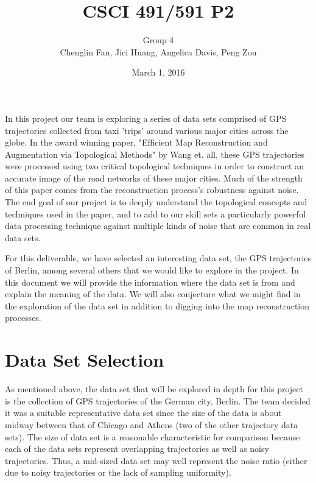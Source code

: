 \documentclass[11pt]{article}
\title{CSCI 491/591 P2}
\date{March 1, 2016}
\author{Group 4\\Chenglin Fan, Jici Huang,
Angelica Davis, Peng Zou}
\begin{document}
\maketitle
\noindent
In this project our team is exploring a series of data sets comprised of GPS trajectories collected from taxi 'trips' around various major cities across the globe. In the award winning paper, "Efficient Map Reconstruction and Augmentation via Topological Methods" by Wang et. all, these GPS trajectories were processed using two critical topological techniques in order to construct an accurate image of the road networks of these major cities. Much of the strength of this paper comes from the reconstruction process's robustness against noise. The end goal of our project is to deeply understand the topological concepts and techniques used in the paper, and to add to our skill sets a particularly powerful data processing technique against multiple kinds of noise that are common in real data sets. 

For this deliverable, we have selected an interesting data set, the GPS trajectories of Berlin, among several others that we would like to explore in the project. In this document we will provide the information where the data set is from and explain the meaning of the data. We will also conjecture what we might find in the exploration of the data set in addition to digging into the map reconstruction processes.
\section*{Data Set Selection}
As mentioned above, the data set that will be explored in depth for this project is the collection of GPS trajectories of the German city, Berlin.
The team decided it was a suitable representative data set since the size of the data is about midway between that of Chicago and Athens (two of the other trajectory data sets). The size of data set is a reasonable characteristic for comparison because each of the data sets represent overlapping trajectories as well as noisy trajectories. Thus, a mid-sized data set may well represent the noise ratio (either due to noisy trajectories or the lack of sampling uniformity). %
\end{document}
